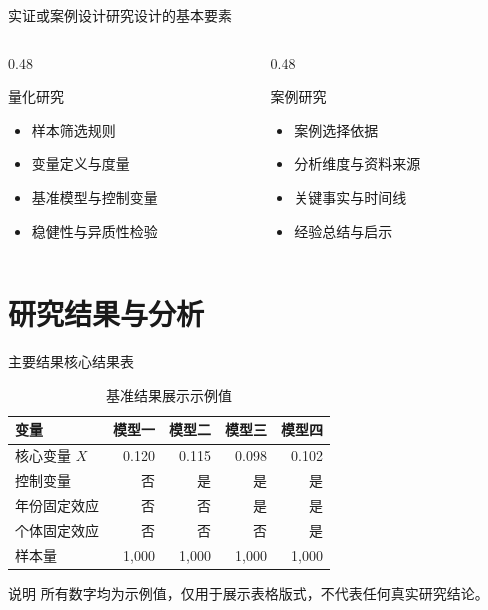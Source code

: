 \documentclass[aspectratio=169,11pt]{beamer}
\begin{document}
\begin{frame}{实证或案例设计}{研究设计的基本要素}
  \begin{columns}[T,onlytextwidth]
    \begin{column}{0.48\textwidth}
      \begin{block}{量化研究}
        \begin{itemize}
          \item 样本筛选规则
          \item 变量定义与度量
          \item 基准模型与控制变量
          \item 稳健性与异质性检验
        \end{itemize}
      \end{block}
    \end{column}
    \begin{column}{0.48\textwidth}
      \begin{block}{案例研究}
        \begin{itemize}
          \item 案例选择依据
          \item 分析维度与资料来源
          \item 关键事实与时间线
          \item 经验总结与启示
        \end{itemize}
      \end{block}
    \end{column}
  \end{columns}
\end{frame}

\section{研究结果与分析}

\begin{frame}{主要结果}{核心结果表}
  \begin{table}
    \centering
    \caption{基准结果展示示例值}
    \begin{tabular}{lrrrr}
      \toprule
      变量 & 模型一 & 模型二 & 模型三 & 模型四 \\
      \midrule
      核心变量 $X$ & 0.120 & 0.115 & 0.098 & 0.102 \\
      控制变量 & 否 & 是 & 是 & 是 \\
      年份固定效应 & 否 & 否 & 是 & 是 \\
      个体固定效应 & 否 & 否 & 否 & 是 \\
      样本量 & 1,000 & 1,000 & 1,000 & 1,000 \\
      \bottomrule
    \end{tabular}
  \end{table}
  \begin{alertblock}{说明}
    所有数字均为示例值，仅用于展示表格版式，不代表任何真实研究结论。
  \end{alertblock}
\end{frame}
\end{document}

